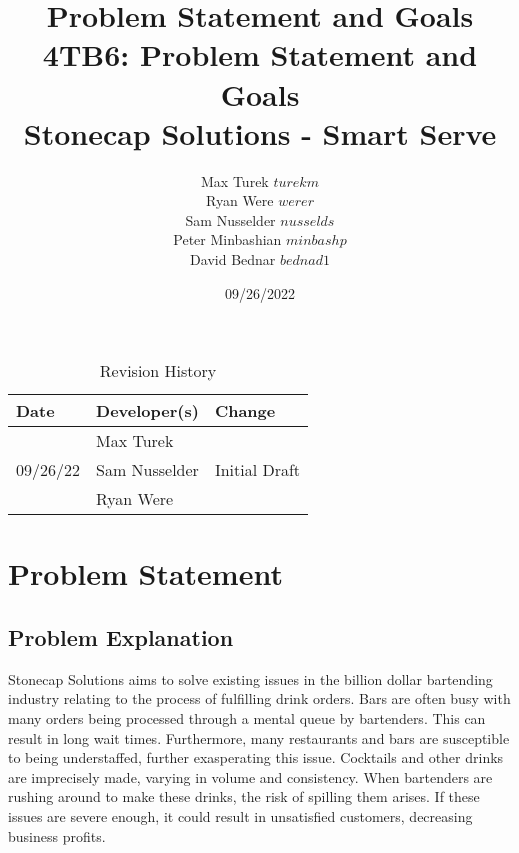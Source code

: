 \documentclass{article}
\title{Problem Statement and Goals\\\progname}
\title{%
\textbf{4TB6: Problem Statement and Goals}\\
\addlinespace
\addlinespace
\addlinespace
\addlinespace
\large \textbf{Stonecap Solutions - Smart Serve}
\addlinespace
\addlinespace
\addlinespace
\addlinespace}
\author{Max Turek $turekm$\\Ryan Were $werer$\\Sam Nusselder $nusselds$\\Peter Minbashian $minbashp$\\David Bednar $bednad1$}
\date{09/26/2022}
\begin{document}
\maketitle
\newpage
\tableofcontents
\addlinespace
\addlinespace
\addlinespace
\addlinespace
\begin{table}[hp]
\caption{Revision History} \label{TblRevisionHistory}
\addlinespace
\addlinespace
\begin{tabularx}{\textwidth}{llX}
\toprule
\textbf{Date} & \textbf{Developer(s)} & \textbf{Change}\\
\midrule
 & Max Turek & \\
09/26/22 & Sam Nusselder & Initial Draft \\
  & Ryan Were & \\
\bottomrule
\end{tabularx}
\end{table}

\newpage

\section{Problem Statement}

\subsection{Problem Explanation}
Stonecap Solutions aims to solve existing issues in the billion dollar bartending industry relating to the process of fulfilling drink orders. Bars are often busy with many orders being processed through a mental queue by bartenders. This can result in long wait times. Furthermore, many restaurants and bars are susceptible to being understaffed, further exasperating this issue. Cocktails and other drinks are imprecisely made, varying in volume and consistency. When bartenders are rushing around to make these drinks, the risk of spilling them arises. If these issues are severe enough, it could result in unsatisfied customers, decreasing business profits.

\end{document}
